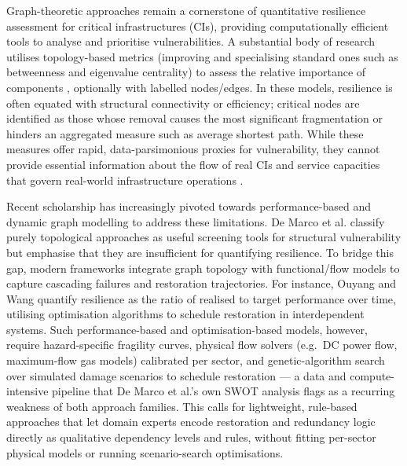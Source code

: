 \documentclass[review,12pt]{elsarticle}
\begin{document}
Graph-theoretic approaches remain a cornerstone of quantitative resilience assessment for critical infrastructures (CIs), providing computationally efficient tools to analyse and prioritise vulnerabilities. A substantial body of research utilises topology-based metrics (improving and specialising standard ones such as betweenness and eigenvalue centrality) to assess the relative importance of components \cite{WANG2021100459, Survey_centrality_hypergraphs}, optionally with labelled nodes/edges. In these models, resilience is often equated with structural connectivity or efficiency; critical nodes are identified as those whose removal causes the most significant fragmentation or hinders an aggregated measure such as average shortest path. While these measures offer rapid, data-parsimonious proxies for vulnerability, they cannot provide essential information about the flow of real CIs and service capacities that govern real-world infrastructure operations \cite{hines_topological_2010,ouyang2013comparisons,bachmann_survey_2020}.

Recent scholarship has increasingly pivoted towards performance-based and dynamic graph modelling to address these limitations. De Marco et al. \cite{DeMarco2025} classify purely topological approaches as useful screening tools for structural vulnerability but emphasise that they are insufficient for quantifying resilience. To bridge this gap, modern frameworks integrate graph topology with functional/flow models to capture cascading failures and restoration trajectories. For instance, Ouyang and Wang \cite{OuyangWang2015} quantify resilience as the ratio of realised to target performance over time, utilising optimisation algorithms to schedule restoration in interdependent systems. Such performance-based and optimisation-based models, however, require hazard-specific fragility curves, physical flow solvers (e.g.\ DC power flow, maximum-flow gas models) calibrated per sector, and genetic-algorithm search over simulated damage scenarios to schedule restoration --- a data and compute-intensive pipeline that De Marco et al.'s own SWOT analysis \cite{DeMarco2025} flags as a recurring weakness of both approach families. This calls for lightweight, rule-based approaches that let domain experts encode restoration and redundancy logic directly as qualitative dependency levels and rules, without fitting per-sector physical models or running scenario-search optimisations.
\end{document}
